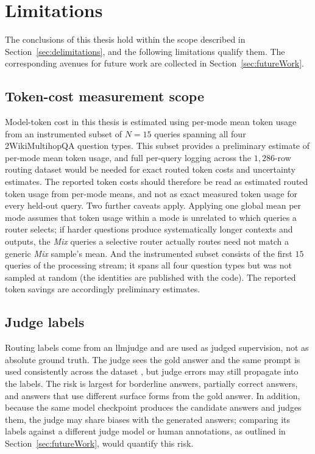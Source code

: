 \documentclass[english, bibtex]{kththesis}               %
\numberwithin{listing}{chapter}
\begin{document}
\section{Limitations}
\label{sec:discLimitations}

The conclusions of this thesis hold within the scope described in Section~\ref{sec:delimitations}, and the following limitations qualify them. The corresponding avenues for future work are collected in Section~\ref{sec:futureWork}.

\subsection{Token-cost measurement scope}
\label{sec:limitTokenCost}

Model-token cost in this thesis is estimated using per-mode mean token usage from an instrumented subset of \(N = 15\) queries spanning all four 2WikiMultihopQA question types. This subset provides a preliminary estimate of per-mode mean token usage, and full per-query logging across the $1{,}286$-row routing dataset would be needed for exact routed token costs and uncertainty estimates. The reported token costs should therefore be read as estimated routed token usage from per-mode means, and not as exact measured token usage for every held-out query. Two further caveats apply. Applying one global mean per mode assumes that token usage within a mode is unrelated to which queries a router selects; if harder questions produce systematically longer contexts and outputs, the \emph{Mix} queries a selective router actually routes need not match a generic \emph{Mix} sample's mean. And the instrumented subset consists of the first $15$ queries of the processing stream; it spans all four question types but was not sampled at random (the identities are published with the code). The reported token savings are accordingly preliminary estimates.

\subsection{Judge labels}
\label{sec:limitJudgeLabels}

Routing labels come from an \gls{llmjudge} and are used as judged supervision, not as absolute ground truth. The judge sees the gold answer and the same prompt is used consistently across the dataset \cite{zheng2023judge}, but judge errors may still propagate into the labels. The risk is largest for borderline answers, partially correct answers, and answers that use different surface forms from the gold answer. In addition, because the same model checkpoint produces the candidate answers and judges them, the judge may share biases with the generated answers; comparing its labels against a different judge model or human annotations, as outlined in Section~\ref{sec:futureWork}, would quantify this risk.
\end{document}
